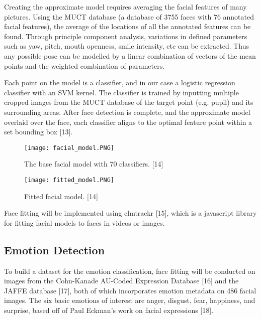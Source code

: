 \documentclass[10pt,twocolumn,letterpaper]{article}
\begin{document}
Creating the approximate model requires averaging the facial features of many pictures. Using the MUCT database (a database of 3755 faces with 76 annotated facial features), the average of the locations of all the annotated features can be found. Through principle component analysis, variations in defined parameters such as yaw, pitch, mouth openness, smile intensity, etc can be extracted. Thus any possible pose can be modelled by a linear combination of vectors of the mean points and the weighted combination of parameters.

Each point on the model is a classifier, and in our case a logistic regression classifier with an SVM kernel. The classifier is trained by inputting multiple cropped images from the MUCT database of the target point (e.g. pupil) and its surrounding areas. After face detection is complete, and the approximate model overlaid over the face, each classifier aligns to the optimal feature point within a set bounding box [13].

\begin{figure}[t]
\begin{center}
   \texttt{[image: facial\_model.PNG]}
\end{center}
   \caption{The base facial model with 70 classifiers. [14]}
\label{fig:long}
\label{fig:onecol}
\end{figure}

\begin{figure}[t]
\begin{center}
   \texttt{[image: fitted\_model.PNG]}
\end{center}
   \caption{Fitted facial model. [14]}
\label{fig:long}
\label{fig:onecol}
\end{figure}

Face fitting will be implemented using clmtrackr [15], which is a javascript library for fitting facial models to faces in videos or images.

\subsection{Emotion Detection}

To build a dataset for the emotion classification, face fitting will be conducted on images from the Cohn-Kanade AU-Coded Expression Database [16] and the JAFFE database [17], both of which incorporates emotion metadata on 486 facial images. The six basic emotions of interest are anger, disgust, fear, happiness, and surprise, based off of Paul Eckman's work on facial expressions [18]. 
\end{document}
